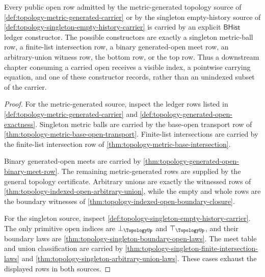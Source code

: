 \begin{theorem}
\label{thm:topology-downstream-open-constructor-coverage}
Every public open row admitted by the metric-generated topology source of \autoref{def:topology-metric-generated-carrier} or by the singleton empty-history source of \autoref{def:topology-singleton-empty-history-carrier} is carried by an explicit $\mathsf{BHist}$ ledger constructor. The possible constructors are exactly a singleton metric-ball row, a finite-list intersection row, a binary generated-open meet row, an arbitrary-union witness row, the bottom row, or the top row. Thus a downstream chapter consuming a carried open receives a visible index, a pointwise carrying equation, and one of these constructor records, rather than an unindexed subset of the carrier.
\end{theorem}
\begin{proof}
For the metric-generated source, inspect the ledger rows listed in \autoref{def:topology-metric-generated-carrier} and \autoref{def:topology-generated-open-exactness}. Singleton metric balls are carried by the base-open transport row of \autoref{thm:topology-metric-base-open-transport}. Finite-list intersections are carried by the finite-list intersection row of \autoref{thm:topology-metric-base-intersection}.

Binary generated-open meets are carried by \autoref{thm:topology-generated-open-binary-meet-row}. The remaining metric-generated rows are supplied by the general topology certificate. Arbitrary unions are exactly the witnessed rows of \autoref{thm:topology-indexed-open-arbitrary-union}, while the empty and whole rows are the boundary witnesses of \autoref{thm:topology-indexed-open-boundary-closure}.

For the singleton source, inspect \autoref{def:topology-singleton-empty-history-carrier}. The only primitive open indices are $\bot_{\TopologyUp}$ and $\top_{\TopologyUp}$, and their boundary laws are \autoref{thm:topology-singleton-boundary-open-laws}. The meet table and union classification are carried by \autoref{thm:topology-singleton-finite-intersection-laws} and \autoref{thm:topology-singleton-arbitrary-union-laws}. These cases exhaust the displayed rows in both sources.
\end{proof}

